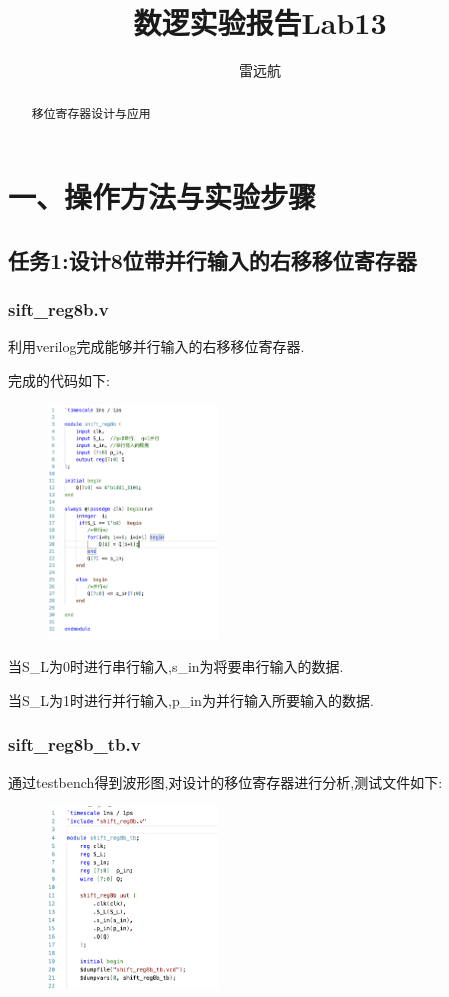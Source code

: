 \documentclass{article}
\title{数逻实验报告Lab13}
\author{雷远航}
\begin{document}
\maketitle

\begin{abstract}
    移位寄存器设计与应用
\end{abstract}

\section*{一、操作方法与实验步骤}
\subsection*{任务1:设计8位带并行输入的右移移位寄存器}
\subsubsection*{sift\_reg8b.v}
利用verilog完成能够并行输入的右移移位寄存器.

完成的代码如下:
\begin{figure}[H]
\centering
\includegraphics[width=0.4\textwidth]{p1.png}

\end{figure}
当S\_L为0时进行串行输入,s\_in为将要串行输入的数据.

当S\_L为1时进行并行输入,p\_in为并行输入所要输入的数据.

\subsubsection*{sift\_reg8b\_tb.v}
通过testbench得到波形图,对设计的移位寄存器进行分析,测试文件如下:
\begin{figure}[H]
    \centering
    \includegraphics[width=0.4\textwidth]{p2.png}
    
    \end{figure}
\end{document}
